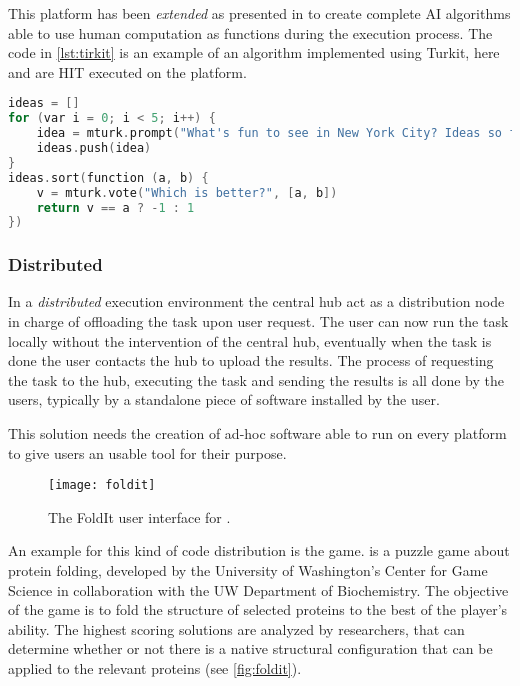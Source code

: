 This platform has been \emph{extended} as presented in \cite{little2010turkit}
to create complete \acl{AI} algorithms able to use human computation as functions
during the execution process. The code in \ref{lst:tirkit} is an example of an
algorithm implemented using Turkit, here  and 
are \acl{HIT} executed on the  platform.
\begin{lstlisting}[language=C++,caption={Example of a Turkit algorithm.},
label={lst:turkit}]
ideas = []
for (var i = 0; i < 5; i++) {
	idea = mturk.prompt("What's fun to see in New York City? Ideas so far: " + ideas.join(", "))
	ideas.push(idea)
}
ideas.sort(function (a, b) {
	v = mturk.vote("Which is better?", [a, b])
	return v == a ? -1 : 1
})
\end{lstlisting}





\subsubsection{Distributed}
In a \emph{distributed} execution environment the central hub act as a distribution
node in charge of offloading the task upon user request. The user can now run the
task locally without the intervention of the central hub, eventually when the task
is done the user contacts the hub to upload the results.
The process of requesting the task to the hub, executing the task and sending the
results is all done by the users, typically by a standalone piece of software
installed by the user.

This solution needs the creation of ad-hoc software able to run on every platform
to give users an usable tool for their purpose.\\


\begin{figure}[htb]
    \centering
    \texttt{[image: foldit]}
    \caption{The FoldIt user interface for .}
    \label{fig:foldit}
\end{figure}
An example for this kind of code distribution is the  game.
 is a puzzle game about protein folding, developed
by the University of Washington's Center for Game Science in collaboration with
the UW Department of Biochemistry. The objective of the game is to fold the
structure of selected proteins to the best of the player's ability. The highest
scoring solutions are analyzed by researchers, that can determine whether or not
there is a native structural configuration that can be applied to the relevant
proteins (see \autoref{fig:foldit}).


